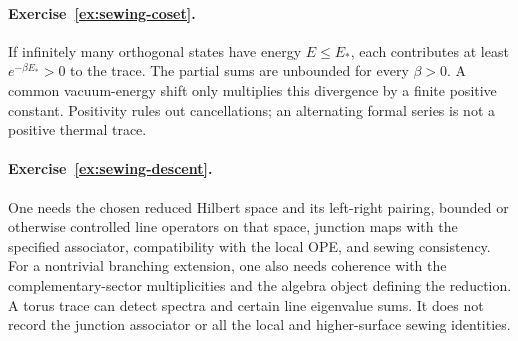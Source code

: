 \paragraph{Exercise~\ref{ex:sewing-coset}.}
\label{sol:ex:sewing-coset}
If infinitely many orthogonal states have energy $E\le E_*$,
each contributes at least $e^{-\beta E_*}>0$ to the trace.
The partial sums are unbounded for every $\beta>0$.
A common vacuum-energy shift only multiplies this divergence
by a finite positive constant. Positivity rules out cancellations;
an alternating formal series is not a positive thermal trace.



\paragraph{Exercise~\ref{ex:sewing-descent}.}
\label{sol:ex:sewing-descent}
One needs the chosen reduced Hilbert space and its left-right
pairing, bounded or otherwise controlled line operators on
that space, junction maps with the specified associator,
compatibility with the local OPE, and sewing consistency.
For a nontrivial branching extension, one also needs coherence
with the complementary-sector multiplicities and the algebra
object defining the reduction. A torus trace can detect
spectra and certain line eigenvalue sums. It does not record
the junction associator or all the local and higher-surface
sewing identities.


